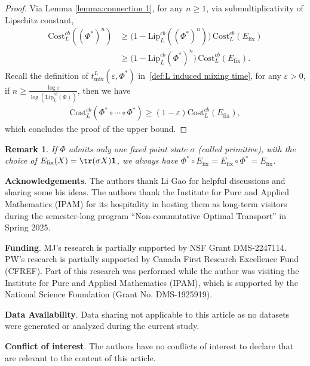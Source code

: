 \documentclass[11pt,reqno]{amsart}
\numberwithin{equation}{section}
\newtheorem{remark}[lemma]{Remark}
\newcommand{\Lip}{\mathrm{Lip}}
\newcommand{\Cost}{\mathrm{Cost}}
\newcommand{\fix}{\mathrm{fix}}
\begin{document}
\begin{proof}
    Via Lemma \ref{lemma:connection 1}, for any $n\ge 1$, via submultiplicativity of Lipschitz constant,
\begin{align*}
    \Cost_L^{cb}((\Phi^*)^n) & \ge \bigl(1 - \Lip_L^{cb}((\Phi^*)^n)\bigr)\, \Cost_L^{cb}(E_\fix) \\
    & \ge \bigl(1 - \Lip_L^{cb}(\Phi^*)^n\bigr)\, \Cost_L^{cb}(E_\fix).
\end{align*}
Recall the definition of $t_{\mathrm{mix}}^L(\varepsilon,\Phi^*) $ in~\eqref{def:L induced mixing time}, for any $\varepsilon>0$, if $n \ge \frac{\log \varepsilon}{ \log (\Lip_L^{cb}(\Phi))}$, then we have 
\begin{align*}
    \Cost_L^{cb}(\Phi^*\circ \cdots \circ \Phi^*) \ge (1-\varepsilon) \Cost_L^{cb}(E_\fix),
\end{align*}
which concludes the proof of the upper bound.
\end{proof}
\begin{remark}
     If $\Phi$ admits only one fixed point state $\sigma$ (called primitive), with the choice of $E_{\fix}(X) = \tr(\sigma X) \textbf{1}$, we always have $\Phi^* \circ E_{\fix} = E_{\fix} \circ \Phi^*= E_{\fix}$.
\end{remark}
\medskip

\noindent \textbf{Acknowledgements}. The authors thank Li Gao for helpful discussions and sharing some his ideas. The authors thank the Institute for Pure and Applied Mathematics (IPAM) for its hospitality in hosting them as long-term visitors during the semester-long program “Non-commutative Optimal Transport” in Spring 2025. 
\medskip

\noindent \textbf{Funding}. MJ's research is partially supported by NSF Grant DMS-2247114. PW's research is partially supported by Canada First Research Excellence Fund (CFREF). Part of this research was performed while the author was visiting the Institute for Pure and Applied Mathematics (IPAM), which is supported by the National Science Foundation (Grant No. DMS-1925919).
\medskip

\noindent \textbf{Data Availability}. Data sharing not applicable to this article as no datasets were generated or analyzed during
the current study. 
\medskip

\noindent \textbf{Conflict of interest}. The authors have no conflicts of interest to declare that are relevant to the content of this article.

 
\end{document}
